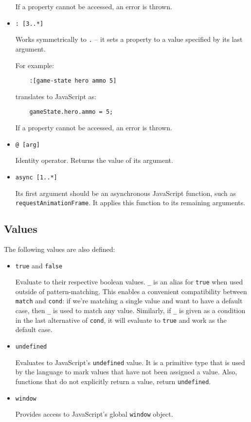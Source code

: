 \begin{itemize}
    If a property cannot be accessed, an error is thrown.
    
    \item \texttt{: [3..*]}
    
    Works symmetrically to \texttt{.} -- it sets a property to a value specified by its last argument.
    
    For example:
    \begin{lstlisting}
    :[game-state hero ammo 5]
    \end{lstlisting}
    
    translates to JavaScript as:
    \begin{lstlisting}
    gameState.hero.ammo = 5;
    \end{lstlisting}
       
    If a property cannot be accessed, an error is thrown.
    
    \item \texttt{@ [arg]}
    
    Identity operator. Returns the value of its argument.
    
    \item \texttt{async [1..*]}
    
    Its first argument should be an asynchronous JavaScript function, such as \texttt{requestAnimationFrame}\cite{mdn_requestanimationframe}. It applies this function to its remaining arguments.
\end{itemize}

\subsection{Values}
The following values are also defined:
\begin{itemize}
    \item \texttt{true} and \texttt{false}
    
    Evaluate to their respective boolean values. \texttt{\_} is an alias for \texttt{true} when used outside of pattern-matching. This enables a convenient compatibility between \texttt{match} and \texttt{cond}: if we're matching a single value and want to have a default case, then \texttt{\_} is used to match any value. Similarly, if \texttt{\_} is given as a condition in the last alternative of \texttt{cond}, it will evaluate to \texttt{true} and work as the default case.
    
    \item \texttt{undefined}
    
    Evaluates to JavaScript's \texttt{undefined} value. It is a primitive type that is used by the language to mark values that have not been assigned a value. Also, functions that do not explicitly return a value, return \texttt{undefined}\cite{mdn_undefined}.
    
    \item \texttt{window} 
    
    Provides access to JavaScript's global \texttt{window} object\cite{mdn_window}.
\end{itemize}


